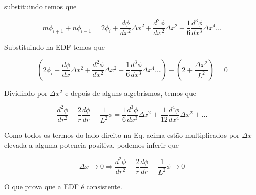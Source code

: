 \documentclass{article}
\begin{document}
        substituindo temos que

        \begin{equation}
            m \phi_{i+1} + n\phi_{i-1}      = 2  \phi_{i}  
                                            +              \frac{d\phi}  {dx^2} \Delta x^2 
                                            +              \frac{d^2\phi}{dx^2} \Delta x^2 
                                            + \frac{1}{6}  \frac{d^3\phi}{dx^3} \Delta x^4 
                                             ...
        \end{equation}%
        
        Substituindo na EDF temos que

        \begin{equation}
            (
            2  \phi_{i}  
            +              \frac{d\phi}  {dx  } \Delta x^2 
            +              \frac{d^2\phi}{dx^2} \Delta x^2 
            + \frac{1}{6}  \frac{d^3\phi}{dx^3} \Delta x^4 
             ...
            ) 
            - 
            (2 + \frac{\Delta x^2}{L^2} ) = 0
        \end{equation}

        Dividindo por $\Delta x^2$ e depois de alguns algebrismos, temos que 

        \begin{equation}
            \frac{d^2\phi}{d r^2}  + \frac{2}{r} \frac{d\phi}{d r} - \frac{1}{L^2} \phi 
            =
             \frac{1}{6}  \frac{d^3\phi}{dx^3} \Delta x^2 
           + \frac{1}{12} \frac{d^4\phi}{dx^4} \Delta x^2 +
             ...
        \end{equation}



        Como todos os termos do lado direito na Eq. acima estão multiplicados por $\Delta x$ elevada a alguma potencia positiva, podemos inferir que
        
        \begin{equation}
            \Delta x \rightarrow 0      \Rightarrow       \frac{d^2\phi}{d r^2}  + \frac{2}{r} \frac{d\phi}{d r} - \frac{1}{L^2} \phi    \rightarrow 0
        \end{equation}

        O que prova que a EDF é consistente.
\end{document}
